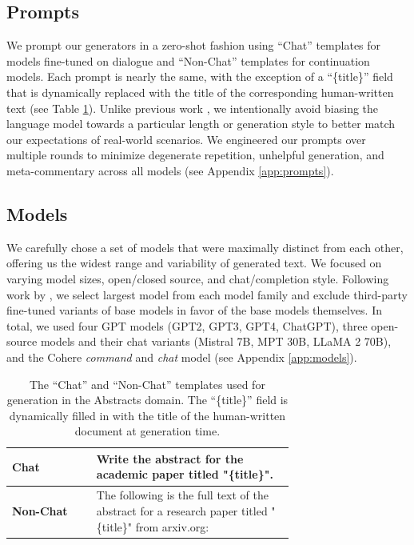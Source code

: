 \documentclass[11pt]{article}
\begin{document}
\subsection{Prompts}
\label{sec:prompts}
We prompt our generators in a zero-shot fashion using ``Chat'' templates for models fine-tuned on dialogue and ``Non-Chat'' templates for continuation models. Each prompt is nearly the same, with the exception of a ``\{title\}'' field that is dynamically replaced with the title of the corresponding human-written text (see Table \ref{tab:prompt-templates}). Unlike previous work \cite{verma2023ghostbuster, xu2023generalization}, we intentionally avoid biasing the language model towards a particular length or generation style to better match our expectations of real-world scenarios. We engineered our prompts over multiple rounds to minimize degenerate repetition, unhelpful generation, and meta-commentary across all models (see Appendix \ref{app:prompts}).

\subsection{Models}
\label{sec:models}
We carefully chose a set of models that were maximally distinct from each other, offering us the widest range and variability of generated text. We focused on varying model sizes, open/closed source, and chat/completion style. Following work by \citet{sarvazyan-etal-2023-supervised}, we select largest model from each model family and exclude third-party fine-tuned variants of base models in favor of the base models themselves. In total, we used four GPT models (GPT2, GPT3, GPT4, ChatGPT), three open-source models and their chat variants (Mistral 7B, MPT 30B, LLaMA 2 70B), and the Cohere \textit{command} and \textit{chat} model (see Appendix \ref{app:models}). 

\begin{table}[t]
\centering 
\small
\begin{tabular}{l|p{0.7\linewidth}}
\toprule
\textbf{Chat}&Write the abstract for the academic paper titled "\{title\}".\\
\midrule
\textbf{Non-Chat}&The following is the full text of the abstract for a research paper titled "\{title\}" from arxiv.org:\\
\bottomrule
\end{tabular}
\caption{The ``Chat'' and ``Non-Chat'' templates used for generation in the Abstracts domain. The ``\{title\}'' field is dynamically filled in with the title of the human-written document at generation time.}
\label{tab:prompt-templates}
\end{table}
\end{document}
